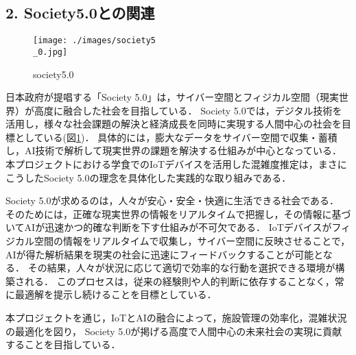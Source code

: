 \subsection*{2. Society5.0との関連}
\begin{figure}[tb]
	\centering
	\texttt{[image: ./images/society5\\\_0.jpg]}
	\caption{society5.0}
	\label{fig:society5.0}
\end{figure}

日本政府が提唱する「Society 5.0」\cite{society5.0}は，サイバー空間とフィジカル空間（現実世界）が高度に融合した社会を目指している．
Society 5.0では，デジタル技術を活用し，様々な社会課題の解決と経済成長を同時に実現する人間中心の社会を目標としている(図\ref{fig:society5.0})．
具体的には，膨大なデータをサイバー空間で収集・蓄積し，AI技術で解析して現実世界の課題を解決する仕組みが中心となっている．
本プロジェクトにおける学食でのIoTデバイスを活用した混雑度推定は，まさにこうしたSociety 5.0の理念を具体化した実践的な取り組みである．

Society 5.0が求めるのは，人々が安心・安全・快適に生活できる社会である．
そのためには，正確な現実世界の情報をリアルタイムで把握し，その情報に基づいてAIが迅速かつ的確な判断を下す仕組みが不可欠である．
IoTデバイスがフィジカル空間の情報をリアルタイムで収集し，サイバー空間に反映させることで，AIが得た解析結果を現実の社会に迅速にフィードバックすることが可能となる．
その結果，人々が状況に応じて適切で効率的な行動を選択できる環境が構築される．
このプロセスは，従来の経験則や人的判断に依存することなく，常に最適解を提示し続けることを目標としている．

本プロジェクトを通じ，IoTとAIの融合によって，施設管理の効率化，混雑状況の最適化を図り，
Society 5.0が掲げる高度で人間中心の未来社会の実現に貢献することを目指している．








%
%
